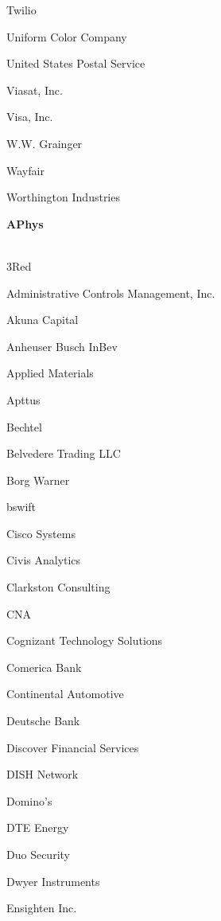 \documentclass[twoside]{article}
\begin{document}
\begin{center}
\begin{multicols}{5}
\begin{FlushLeft}
\begin{compactitem}
\item Twilio
\item Uniform Color Company
\item United States Postal Service
\item Viasat, Inc.
\item Visa, Inc.
\item W.W. Grainger
\item Wayfair
\item Worthington Industries
\end{compactitem}
        \end{FlushLeft}
        \vspace{1em}
        {\fontsize{14}{16}\selectfont \bf APhys}\\
        \vspace{-1em}
        ~\hrulefill~
        \vspace{-.9em}
        \begin{FlushLeft}
        \begin{compactitem}
        \item 3Red
\item Administrative Controls Management, Inc.
\item Akuna Capital
\item Anheuser Busch InBev
\item Applied Materials
\item Apttus
\item Bechtel
\item Belvedere Trading LLC
\item Borg Warner
\item bswift
\item Cisco Systems
\item Civis Analytics
\item Clarkston Consulting
\item CNA
\item Cognizant Technology Solutions
\item Comerica Bank
\item Continental Automotive
\item Deutsche Bank
\item Discover Financial Services
\item DISH Network
\item Domino's
\item DTE Energy
\item Duo Security
\item Dwyer Instruments
\item Ensighten Inc.

\end{compactitem}
\end{FlushLeft}
\end{multicols}
\end{center}
\end{document}
